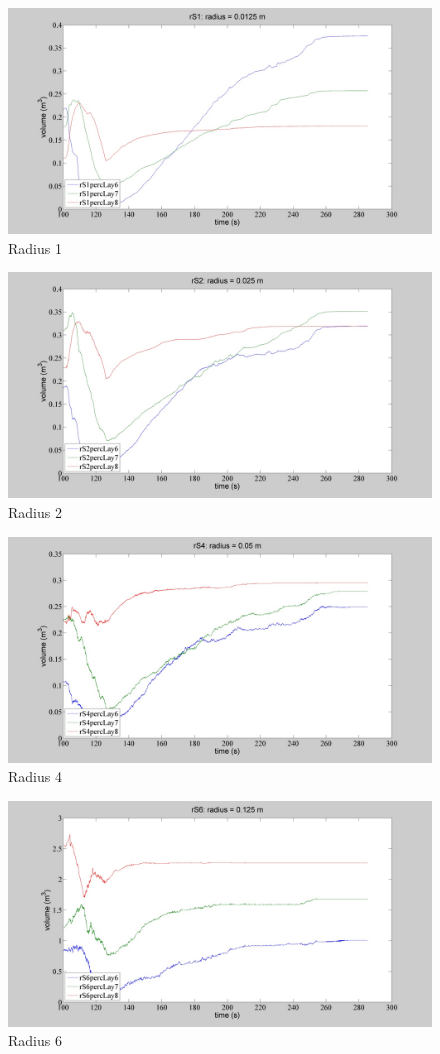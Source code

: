 \begin{figure}%
\centering 
\includegraphics[width=.48\columnwidth]{043rS1} 
\caption{Radius 1}
\label{fig:043rS1} 
\end{figure}
\begin{figure}%
\centering 
\includegraphics[width=.48\columnwidth]{044rS2} 
\caption{Radius 2}
\label{fig:044rS2} 
\end{figure}
\begin{figure}%
\centering 
\includegraphics[width=.48\columnwidth]{045rS4}
\caption{Radius 4}
\label{fig:045rS4} 
\end{figure}
\begin{figure}%
\centering 
\includegraphics[width=.48\columnwidth]{046rS6} 
\caption{Radius 6}
\label{fig:046rS6} 
\end{figure}